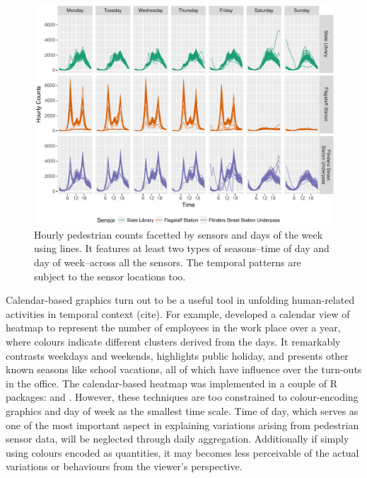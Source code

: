 \documentclass[article]{jss}
\begin{document}
\begin{CodeChunk}
\begin{figure}

{\centering \includegraphics[width=\textwidth]{figure/facet-time-1} 

}

\caption[Hourly pedestrian counts facetted by sensors and days of the week using lines]{Hourly pedestrian counts facetted by sensors and days of the week using lines. It features at least two types of seasons--time of day and day of week--across all the sensors. The temporal patterns are subject to the sensor locations too.}\label{fig:facet-time}
\end{figure}
\end{CodeChunk}

Calendar-based graphics turn out to be a useful tool in unfolding
human-related activities in temporal context (cite). For example,
\citet{VanWijkCluster1999} developed a calendar view of heatmap to
represent the number of employees in the work place over a year, where
colours indicate different clusters derived from the days. It remarkably
contrasts weekdays and weekends, highlights public holiday, and presents
other known seasons like school vacations, all of which have influence
over the turn-outs in the office. The calendar-based heatmap was
implemented in a couple of R packages: 
\citep{R-ggTimeSeries} and  \citep{R-ggcal}. However, these
techniques are too constrained to colour-encoding graphics and day of
week as the smallest time scale. Time of day, which serves as one of the
most important aspect in explaining variations arising from pedestrian
sensor data, will be neglected through daily aggregation. Additionally
if simply using colours encoded as quantities, it may becomes less
perceivable of the actual variations or behaviours from the viewer's
perspective.
\end{document}
